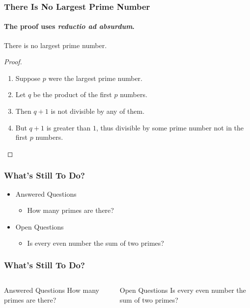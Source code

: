 \documentclass[t,aspectratio=54]{beamer}
\begin{document}
    \begin{frame}
        \frametitle{There Is No Largest Prime Number}
        \framesubtitle{The proof uses \textit{reductio ad absurdum}.}
        \begin{theorem}
          There is no largest prime number.
        \end{theorem}
        \begin{proof}
          \begin{enumerate}
          \item<1-> Suppose $p$ were the largest prime number.
          \item<2-> Let $q$ be the product of the first $p$ numbers.
          \item<3-> Then $q + 1$ is not divisible by any of them.
          \item<1-> But $q + 1$ is greater than $1$, thus divisible by some prime
            number not in the first $p$ numbers.\qedhere
          \end{enumerate}
      \end{proof}
    \end{frame}
    
    \begin{frame}
        \frametitle{What’s Still To Do?}
        \begin{itemize}
        \item Answered Questions
          \begin{itemize}
          \item How many primes are there?
          \end{itemize}
        \item Open Questions
          \begin{itemize}
          \item Is every even number the sum of two primes?
          \end{itemize}
        \end{itemize}
    \end{frame}

    \begin{frame}
        \frametitle{What’s Still To Do?}
        \begin{columns}
            \begin{block}{Answered Questions}
              How many primes are there?
            \end{block}
            \begin{block}{Open Questions}
                Is every even number the sum of two primes?
            \end{block}
        \end{columns}
    \end{frame}
\end{document}
